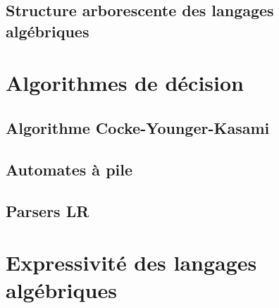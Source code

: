 \subsection{Structure arborescente des langages algébriques}






 
\section{Algorithmes de décision}
 
\subsection{Algorithme Cocke-Younger-Kasami}




 
\subsection{Automates à pile}











 
\subsection{Parsers LR}







 
\section{Expressivité des langages algébriques}
 
